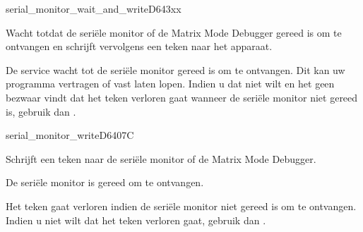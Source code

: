\newpage
\begin{hyppotrap}{serial\_monitor\_wait\_and\_write}{D643}{xx}

\item [Dienst:]  Wacht totdat de seriële monitor of de Matrix Mode Debugger gereed is om te ontvangen en schrijft vervolgens een teken naar het apparaat.
\item [Invoer:]  
\item [Geschiedenis:]
\item [Opmerkingen:]  De service wacht tot de seriële monitor gereed is om te ontvangen. Dit kan uw programma vertragen of vast laten lopen. Indien u dat niet wilt en het geen bezwaar vindt dat het teken verloren gaat wanneer de seriële monitor niet gereed is, gebruik dan .
\end{hyppotrap}


\newpage
\begin{hyppotrap}{serial\_monitor\_write}{D640}{7C}

\item [Dienst:]  Schrijft een teken naar de seriële monitor of de Matrix Mode Debugger.
\item [Voorwaarden:]  De seriële monitor is gereed om te ontvangen.
\item [Invoer:]  
\item [Geschiedenis:]
\item [Opmerkingen:]  Het teken gaat verloren indien de seriële monitor niet gereed is om te ontvangen. Indien u niet wilt dat het teken verloren gaat, gebruik dan .
\end{hyppotrap}


